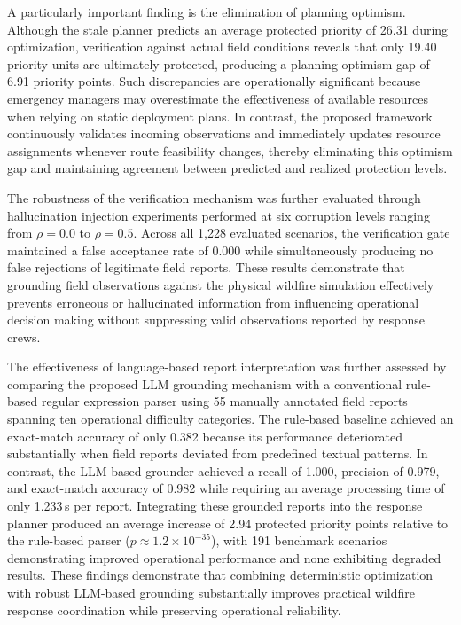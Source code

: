 \documentclass{ieeeaccess}
\begin{document}
A particularly important finding is the elimination of planning optimism. Although the stale planner predicts an average protected priority of 26.31 during optimization, verification against actual field conditions reveals that only 19.40 priority units are ultimately protected, producing a planning optimism gap of 6.91 priority points. Such discrepancies are operationally significant because emergency managers may overestimate the effectiveness of available resources when relying on static deployment plans. In contrast, the proposed framework continuously validates incoming observations and immediately updates resource assignments whenever route feasibility changes, thereby eliminating this optimism gap and maintaining agreement between predicted and realized protection levels.

The robustness of the verification mechanism was further evaluated through hallucination injection experiments performed at six corruption levels ranging from $\rho=0.0$ to $\rho=0.5$. Across all 1,228 evaluated scenarios, the verification gate maintained a false acceptance rate of 0.000 while simultaneously producing no false rejections of legitimate field reports. These results demonstrate that grounding field observations against the physical wildfire simulation effectively prevents erroneous or hallucinated information from influencing operational decision making without suppressing valid observations reported by response crews.

The effectiveness of language-based report interpretation was further assessed by comparing the proposed LLM grounding mechanism with a conventional rule-based regular expression parser using 55 manually annotated field reports spanning ten operational difficulty categories. The rule-based baseline achieved an exact-match accuracy of only 0.382 because its performance deteriorated substantially when field reports deviated from predefined textual patterns. In contrast, the LLM-based grounder achieved a recall of 1.000, precision of 0.979, and exact-match accuracy of 0.982 while requiring an average processing time of only 1.233\,s per report. Integrating these grounded reports into the response planner produced an average increase of 2.94 protected priority points relative to the rule-based parser ($p \approx 1.2\times10^{-35}$), with 191 benchmark scenarios demonstrating improved operational performance and none exhibiting degraded results. These findings demonstrate that combining deterministic optimization with robust LLM-based grounding substantially improves practical wildfire response coordination while preserving operational reliability.
\end{document}

